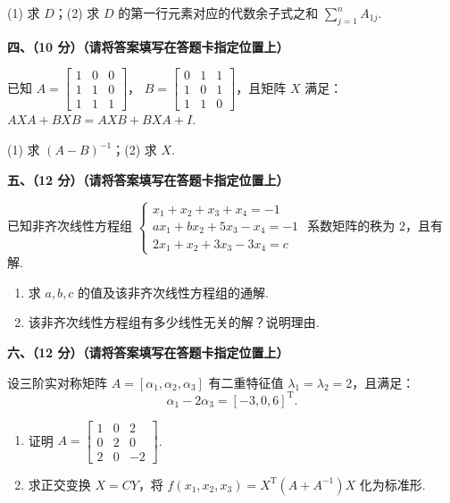 \documentclass[a4paper,11pt]{ctexart}
\newcommand{\T}{\mathrm{T}}
\begin{document}
(1) 求 $D$；\qquad (2) 求 $D$ 的第一行元素对应的代数余子式之和 $\sum_{j=1}^n A_{1j}$.

\vspace{0.8em}

\textbf{四、（10 分）（请将答案填写在答题卡指定位置上）}

已知 $A = \begin{bmatrix} 1 & 0 & 0 \\ 1 & 1 & 0 \\ 1 & 1 & 1 \end{bmatrix}$， $B = \begin{bmatrix} 0 & 1 & 1 \\ 1 & 0 & 1 \\ 1 & 1 & 0 \end{bmatrix}$，且矩阵 $X$ 满足：$AXA + BXB = AXB + BXA + I$.

(1) 求 $(A - B)^{-1}$；\qquad (2) 求 $X$.

\vspace{0.8em}

\textbf{五、（12 分）（请将答案填写在答题卡指定位置上）}

已知非齐次线性方程组 $\begin{cases} x_1 + x_2 + x_3 + x_4 = -1 \\ a x_1 + b x_2 + 5 x_3 - x_4 = -1 \\ 2 x_1 + x_2 + 3 x_3 - 3 x_4 = c \end{cases}$ 系数矩阵的秩为 $2$，且有解.
\begin{enumerate}[label=(\arabic*), leftmargin=2.4em, itemsep=0.25em, topsep=0.3em]
  \item 求 $a, b, c$ 的值及该非齐次线性方程组的通解.
  \item 该非齐次线性方程组有多少线性无关的解？说明理由.
\end{enumerate}

\vspace{0.8em}

\textbf{六、（12 分）（请将答案填写在答题卡指定位置上）}

设三阶实对称矩阵 $A = [\alpha_1, \alpha_2, \alpha_3]$ 有二重特征值 $\lambda_1 = \lambda_2 = 2$，且满足：
\[
  \alpha_1 - 2\alpha_3 = [-3, 0, 6]^{\T}.
\]
\begin{enumerate}[label=(\arabic*), leftmargin=2.4em, itemsep=0.25em, topsep=0.3em]
  \item 证明 $A = \begin{bmatrix} 1 & 0 & 2 \\ 0 & 2 & 0 \\ 2 & 0 & -2 \end{bmatrix}$.
  \item 求正交变换 $X = CY$，将 $f(x_1, x_2, x_3) = X^{\T}(A + A^{-1})X$ 化为标准形.
\end{enumerate}
\end{document}
